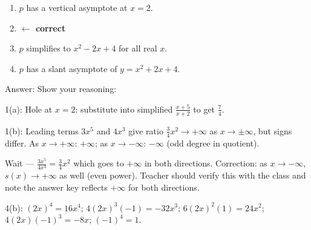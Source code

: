\documentclass[10pt]{article}
\begin{document}
\begin{enumerate}[itemsep=18pt]
      \medskip
      \begin{enumerate}[label=(\Alph*), itemsep=4pt]
        \item $p$ has a vertical asymptote at $x = 2$.
        \item {} \textcolor{keyred}{\textbf{$\leftarrow$ correct}}
        \item $p$ simplifies to $x^2 - 2x + 4$ for all real $x$.
        \item $p$ has a slant asymptote of $y = x^2 + 2x + 4$.
      \end{enumerate}

      \vspace{0.06in}
      Answer:  \quad Show your reasoning:

      \vspace{0.06in}

\end{enumerate}

\begin{teachernote}
1(a): Hole at $x=2$: substitute into simplified $\frac{x+5}{x+2}$ to get $\frac{7}{4}$.

1(b): Leading terms $3x^5$ and $4x^3$ give ratio $\frac{3}{4}x^2 \to +\infty$ as $x\to\pm\infty$, but signs differ. As $x\to+\infty$: $+\infty$; as $x\to-\infty$: $-\infty$ (odd degree in quotient).

Wait --- $\frac{3x^5}{4x^3} = \frac{3}{4}x^2$ which goes to $+\infty$ in both directions. Correction: as $x\to-\infty$, $s(x)\to+\infty$ as well (even power). Teacher should verify this with the class and note the answer key reflects $+\infty$ for both directions.

4(b): $(2x)^4 = 16x^4$; $4(2x)^3(-1) = -32x^3$; $6(2x)^2(1)=24x^2$; $4(2x)(-1)^3=-8x$; $(-1)^4=1$.
\end{teachernote}
\end{document}
